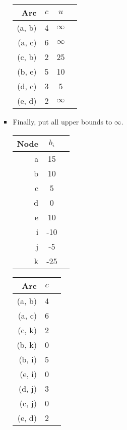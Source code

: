 \documentclass[12pt]{article}
\begin{document}
\begin{enumerate}
\begin{enumerate}
\begin{itemize}
\begin{tabular}{|r|c|c|}
            \end{tabular}
            \begin{tabular}{|r|c|c|c|}
              \hline
              Arc & $c$ & $u$ \\ \hline
              (a, b) & 4 & $\infty$ \\ \hline
              (a, c) & 6 & $\infty$ \\ \hline
              (c, b) & 2 & 25 \\ \hline
              (b, e) & 5 & 10 \\ \hline
              (d, c) & 3 & 5 \\ \hline
              (e, d) & 2 & $\infty$ \\ \hline
            \end{tabular}
          \item Finally, put all upper bounds to $\infty$.\\
            \begin{tabular}{|r|c|c|}
              \hline
              Node & $b_i$ \\\hline
              a & 15 \\ \hline
              b & 10 \\ \hline
              c & 5 \\ \hline
              d & 0 \\ \hline
              e & 10 \\ \hline
              i & -10 \\ \hline
              j & -5 \\ \hline
              k & -25 \\ \hline
            \end{tabular}
            \begin{tabular}{|r|c|c|}
              \hline
              Arc & $c$ \\ \hline
              (a, b) & 4 \\ \hline
              (a, c) & 6 \\ \hline
              (c, k) & 2 \\ \hline
              (b, k) & 0 \\ \hline
              (b, i) & 5 \\ \hline
              (e, i) & 0 \\ \hline
              (d, j) & 3 \\ \hline
              (c, j) & 0 \\ \hline
              (e, d) & 2 \\ \hline

\end{tabular}
\end{itemize}
\end{enumerate}
\end{enumerate}
\end{document}

